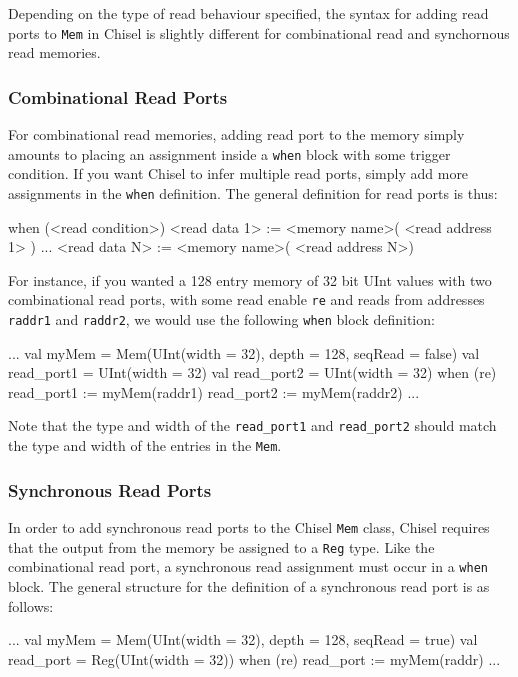 \documentclass[twocolumn, 10pt]{article}
\begin{document}
Depending on the type of read behaviour specified, the syntax for adding read ports to \verb+Mem+ in Chisel is slightly different for combinational read and synchornous read memories.

\subsubsection{Combinational Read Ports}

For combinational read memories, adding read port to the memory simply amounts to placing an assignment inside a \verb+when+ block with some trigger condition. If you want Chisel to infer multiple read ports, simply add more assignments in the \verb+when+ definition. The general definition for read ports is thus:

\begin{scala}
when (<read condition>) {
  <read data 1> := <memory name>( <read address 1> )
  ...
  <read data N> := <memory name>( <read address N>)
}
\end{scala}

For instance, if you wanted a 128 entry memory of 32 bit UInt values with two combinational read ports, with some read enable \verb+re+ and reads from addresses \verb+raddr1+ and \verb+raddr2+, we would use the following \verb+when+ block definition:

\begin{scala}
...
val myMem = Mem(UInt(width = 32), depth = 128, seqRead = false)
val read_port1 = UInt(width = 32)
val read_port2 = UInt(width = 32)
when (re) {
  read_port1 := myMem(raddr1)
  read_port2 := myMem(raddr2)
}
...
\end{scala}

Note that the type and width of the \verb+read_port1+ and \verb+read_port2+ should match the type and width of the entries in the \verb+Mem+.

\subsubsection{Synchronous Read Ports}

In order to add synchronous read ports to the Chisel \verb+Mem+ class, Chisel requires that the output from the memory be assigned to a \verb+Reg+ type. Like the combinational read port, a synchronous read assignment must occur in a \verb+when+ block. The general structure for the definition of a synchronous read port is as follows:

\begin{scala}
...
val myMem = Mem(UInt(width = 32), depth = 128, seqRead = true)
val read_port = Reg(UInt(width = 32))
when (re) {
  read_port := myMem(raddr)
}
...
\end{scala}
\end{document}
